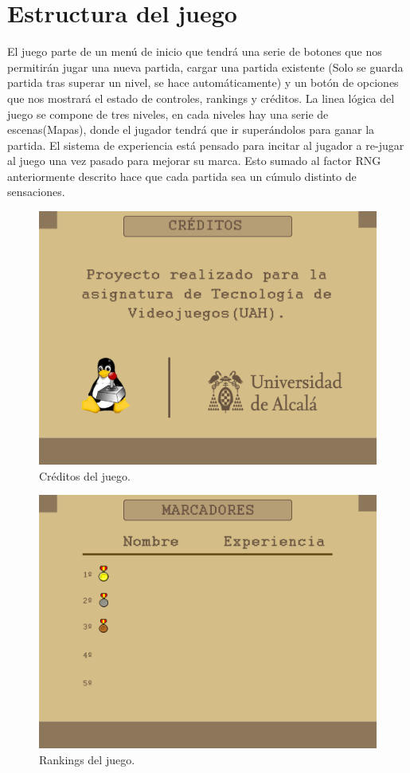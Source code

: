 \section{Estructura del juego}
El juego parte de un menú de inicio que tendrá una serie de botones que nos permitirán jugar una nueva partida, cargar una partida existente (Solo se guarda partida tras superar un nivel, se hace automáticamente) y un botón de opciones que nos mostrará el estado de controles, rankings y créditos.\newline
\newline
La linea lógica del juego se compone de tres niveles, en cada niveles hay una serie de escenas(Mapas), donde el jugador tendrá que ir superándolos para ganar la partida. El sistema de experiencia está pensado para incitar al jugador a re-jugar al juego una vez pasado para mejorar su marca. Esto sumado al factor RNG anteriormente descrito hace que cada partida sea un cúmulo distinto de sensaciones.
\begin{figure}[!htb]
  \centering
    \includegraphics[width=\linewidth]{./img/creditos.png}
    \caption{Créditos del juego.}
  \label{fig:yo}
\end{figure}
\newpage
\begin{figure}[!htb]
  \centering
    \includegraphics[width=\linewidth]{./img/marcadores.png}
    \caption{Rankings del juego.}
  \label{fig:yo}
\end{figure}
